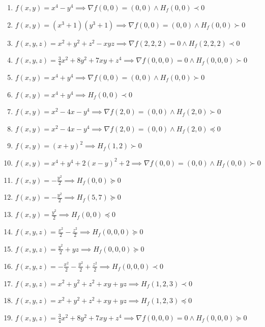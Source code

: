 \documentclass[11pt,a4paper]{article}
\begin{document}
\begin{enumerate}
\item $\displaystyle f(x, y) = x^{4} - y^{4} \implies \nabla f(0, 0) = (0, 0) \land H_{f}(0, 0) \prec 0$
\item $\displaystyle f(x, y) = (x^{3} + 1)(y^{3} + 1) \implies \nabla f(0, 0) = (0, 0) \land H_{f}(0, 0) \succ 0$
\item $\displaystyle f(x, y, z) = x^{2} + y^{2} + z^{2} - xyz \implies \nabla f(2, 2, 2) = 0 \land H_{f}(2, 2, 2) \prec 0$
\item $\displaystyle f(x, y, z) = \frac{3}{4} x^{2} + 8y^{2} + 7xy + z^{4} \implies \nabla f(0, 0, 0) = 0 \land H_{f}(0, 0, 0) \succ 0$
\item $\displaystyle f(x, y) = x^{4} + y^{4} \implies \nabla f(0, 0) = (0, 0) \land H_{f}(0, 0) \succ 0$
\item $\displaystyle f(x, y) = x^{4} + y^{4} \implies H_{f}(0, 0) \prec 0$
\item $\displaystyle f(x, y) = x^{2} - 4x - y^{4} \implies \nabla f(2, 0) = (0, 0) \land H_{f}(2, 0) \succ 0$
\item $\displaystyle f(x, y) = x^{2} - 4x - y^{4} \implies \nabla f(2, 0) = (0, 0) \land H_{f}(2, 0) \preceq 0$
\item $\displaystyle f(x, y) = (x + y)^{2} \implies H_{f}(1, 2) \succ 0$
\item $\displaystyle f(x, y) = x^{4} + y^{4} + 2(x - y)^{2} + 2 \implies \nabla f(0, 0) = (0, 0) \land H_{f}(0, 0) \succ 0$
\item $\displaystyle f(x, y) = -\frac{y^{2}}{2} \implies H_{f}(0, 0) \succeq 0$
\item $\displaystyle f(x, y) = -\frac{y^{2}}{2} \implies H_{f}(5, 7) \succeq 0$
\item $\displaystyle f(x, y) = \frac{y^{2}}{2} \implies H_{f}(0, 0) \preceq 0$
\item $\displaystyle f(x, y, z) = \frac{x^{2}}{2} - \frac{z^{2}}{2} \implies H_{f}(0, 0, 0) \succeq 0$
\item $\displaystyle f(x, y, z) = \frac{y^{2}}{2} + yz \implies H_{f}(0, 0, 0) \succeq 0$
\item $\displaystyle f(x, y, z) = -\frac{x^{2}}{2} - \frac{y^{2}}{2} + \frac{z^{2}}{2} \implies H_{f}(0, 0, 0) \prec 0$
\item $\displaystyle f(x, y, z) = x^{2} + y^{2} + z^{2} + xy + yz \implies H_{f}(1, 2, 3) \prec 0$
\item $\displaystyle f(x, y, z) = x^{2} + y^{2} + z^{2} + xy + yz \implies H_{f}(1, 2, 3) \preceq 0$
\item $\displaystyle f(x, y, z) = \frac{3}{4} x^{2} + 8y^{2} + 7xy + z^{4} \implies \nabla f(0, 0, 0) = 0 \land H_{f}(0, 0, 0) \succeq 0$

\end{enumerate}
\end{document}
